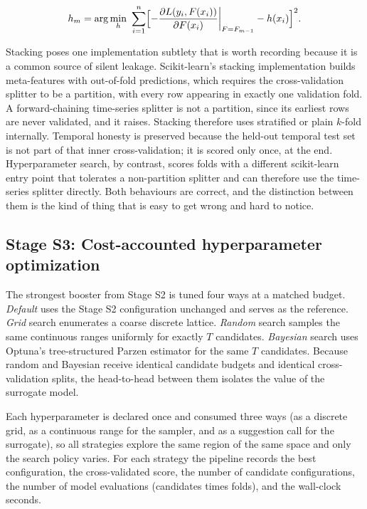 \documentclass{ieeeaccess}
\begin{document}
\begin{equation}
h_m = \arg\min_{h}\ \sum_{i=1}^{n}\Bigl[-\frac{\partial L(y_i, F(x_i))}{\partial F(x_i)}\bigg|_{F=F_{m-1}} - h(x_i)\Bigr]^2.
\label{eq:gbm}
\end{equation}

Stacking poses one implementation subtlety that is worth recording because it is a common source of silent leakage. Scikit-learn's stacking implementation builds meta-features with out-of-fold predictions, which requires the cross-validation splitter to be a partition, with every row appearing in exactly one validation fold. A forward-chaining time-series splitter is not a partition, since its earliest rows are never validated, and it raises. Stacking therefore uses stratified or plain $k$-fold internally. Temporal honesty is preserved because the held-out temporal test set is not part of that inner cross-validation; it is scored only once, at the end. Hyperparameter search, by contrast, scores folds with a different scikit-learn entry point that tolerates a non-partition splitter and can therefore use the time-series splitter directly. Both behaviours are correct, and the distinction between them is the kind of thing that is easy to get wrong and hard to notice.

\subsection{Stage S3: Cost-accounted hyperparameter optimization}
The strongest booster from Stage S2 is tuned four ways at a matched budget. \emph{Default} uses the Stage S2 configuration unchanged and serves as the reference. \emph{Grid} search enumerates a coarse discrete lattice. \emph{Random} search samples the same continuous ranges uniformly for exactly $T$ candidates. \emph{Bayesian} search uses Optuna's tree-structured Parzen estimator \cite{akiba2019optuna} for the same $T$ candidates. Because random and Bayesian receive identical candidate budgets and identical cross-validation splits, the head-to-head between them isolates the value of the surrogate model.

Each hyperparameter is declared once and consumed three ways (as a discrete grid, as a continuous range for the sampler, and as a suggestion call for the surrogate), so all strategies explore the same region of the same space and only the search policy varies. For each strategy the pipeline records the best configuration, the cross-validated score, the number of candidate configurations, the number of model evaluations (candidates times folds), and the wall-clock seconds.
\end{document}
